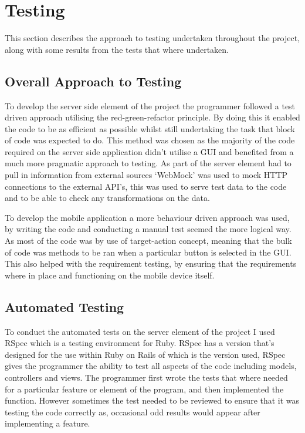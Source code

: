 \chapter{Testing}

	This section describes the approach to testing undertaken throughout the project, along with some results from the tests that where undertaken.

\section{Overall Approach to Testing}
	To develop the server side element of the project the programmer followed a test driven approach utilising the red-green-refactor principle.  By doing this it enabled the code to be as efficient as possible whilst still undertaking the task that block of code was expected to do. This method was chosen as the majority of the code required on the server side application didn't utilise a GUI and benefited from a much more pragmatic  approach to testing. As part of the server element had to pull in information from external sources `WebMock' was used to mock HTTP connections to the external API's, this was used to serve test data to the code and to be able to check any transformations on the data. 

	To develop the mobile application a more behaviour driven approach was used, by writing the code and conducting  a manual test seemed the more logical way. As most of the code was by use of target-action concept, meaning that the bulk of code was methods to be ran when a particular button is selected in the GUI. This also helped with the requirement testing, by ensuring that the requirements where in place and functioning on the mobile device itself. 
	
\section{Automated Testing}
	To conduct the automated tests on the server element of the project I used RSpec which is a testing environment for Ruby. RSpec has a version that's designed for the use within Ruby on Rails of which is the version used, RSpec gives the programmer the ability to test all aspects of the code including models, controllers and views. The programmer first wrote the tests that where needed for a particular feature or element of the program, and then implemented the function. However sometimes the test needed to be reviewed to ensure that it was testing the code correctly as, occasional odd results would appear after implementing a feature. 
	
